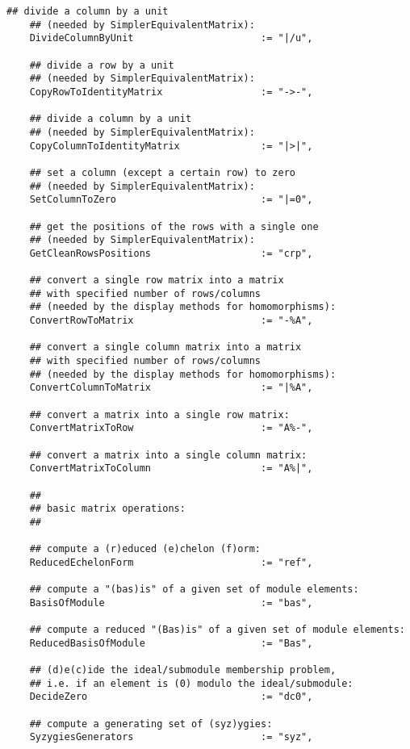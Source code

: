 \documentclass[a4paper,11pt]{report}
\begin{document}
{{{\begin{Verbatim}[fontsize=\small,frame=single,label=Code]
    ## divide a column by a unit
    ## (needed by SimplerEquivalentMatrix):
    DivideColumnByUnit                      := "|/u",
    
    ## divide a row by a unit
    ## (needed by SimplerEquivalentMatrix):
    CopyRowToIdentityMatrix                 := "->-",
    
    ## divide a column by a unit
    ## (needed by SimplerEquivalentMatrix):
    CopyColumnToIdentityMatrix              := "|>|",
    
    ## set a column (except a certain row) to zero
    ## (needed by SimplerEquivalentMatrix):
    SetColumnToZero                         := "|=0",
    
    ## get the positions of the rows with a single one
    ## (needed by SimplerEquivalentMatrix):
    GetCleanRowsPositions                   := "crp",
    
    ## convert a single row matrix into a matrix
    ## with specified number of rows/columns
    ## (needed by the display methods for homomorphisms):
    ConvertRowToMatrix                      := "-%A",
    
    ## convert a single column matrix into a matrix
    ## with specified number of rows/columns
    ## (needed by the display methods for homomorphisms):
    ConvertColumnToMatrix                   := "|%A",
    
    ## convert a matrix into a single row matrix:
    ConvertMatrixToRow                      := "A%-",
    
    ## convert a matrix into a single column matrix:
    ConvertMatrixToColumn                   := "A%|",
    
    ##
    ## basic matrix operations:
    ##
    
    ## compute a (r)educed (e)chelon (f)orm:
    ReducedEchelonForm                      := "ref",
    
    ## compute a "(bas)is" of a given set of module elements:
    BasisOfModule                           := "bas",
    
    ## compute a reduced "(Bas)is" of a given set of module elements:
    ReducedBasisOfModule                    := "Bas",
    
    ## (d)e(c)ide the ideal/submodule membership problem,
    ## i.e. if an element is (0) modulo the ideal/submodule:
    DecideZero                              := "dc0",
    
    ## compute a generating set of (syz)ygies:
    SyzygiesGenerators                      := "syz",
    

\end{Verbatim}}}}
\end{document}
